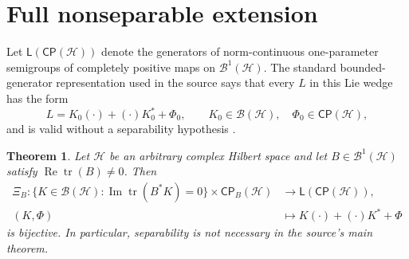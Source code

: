 \documentclass[11pt]{article}
\newtheorem{theorem}{Theorem}
\newcommand{\Hh}{\mathcal H}
\newcommand{\Bcal}{\mathcal B}
\newcommand{\CP}{\mathsf{CP}}
\newcommand{\tr}{\operatorname{tr}}
\begin{document}
\section{Full nonseparable extension}

Let $\mathsf L(\CP(\Hh))$ denote the generators of norm-continuous
one-parameter semigroups of completely positive maps on
$\Bcal^1(\Hh)$.  The standard bounded-generator representation used in the
source says that every $L$ in this Lie wedge has the form
\begin{equation}\label{eq:standard}
 L=K_0(\cdot)+(\cdot)K_0^*+\Phi_0,
 \qquad K_0\in\Bcal(\Hh),\quad\Phi_0\in\CP(\Hh),
\end{equation}
and is valid without a separability hypothesis
\cite{ChristensenEvans,vomEnde}.

\begin{theorem}\label{thm:main}
Let $\Hh$ be an arbitrary complex Hilbert space and let
$B\in\Bcal^1(\Hh)$ satisfy $\operatorname{Re}\tr(B)\ne0$.  Then
\[
\begin{aligned}
\Xi_B:\{K\in\Bcal(\Hh):\operatorname{Im}\tr(B^*K)=0\}
 \times\CP_B(\Hh)&\longrightarrow\mathsf L(\CP(\Hh)),\\
(K,\Phi)&\longmapsto K(\cdot)+(\cdot)K^*+\Phi
\end{aligned}
\]
is bijective.  In particular, separability is not necessary in the source's
main theorem.
\end{theorem}
\end{document}
